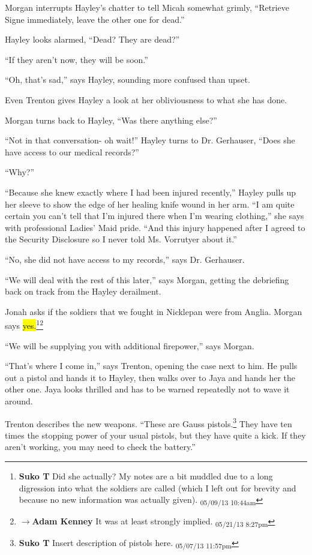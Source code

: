 Morgan interrupts Hayley's chatter to tell Micah somewhat grimly, ``Retrieve Signe immediately, leave the other one for dead.''

Hayley looks alarmed, ``Dead?  They are dead?''

``If they aren't now, they will be soon.''

``Oh, that's sad,'' says Hayley, sounding more confused than upset.

Even Trenton gives Hayley a look at her obliviousness to what she has done.

Morgan turns back to Hayley, ``Was there anything else?''

``Not in that conversation- oh wait!''  Hayley turns to Dr. Gerhauser, ``Does she have access to our medical records?''

``Why?''

``Because she knew exactly where I had been injured recently,'' Hayley pulls up her sleeve to show the edge of her healing knife wound in her arm. ``I am quite certain you can't tell that I'm injured there when I'm wearing clothing,'' she says with professional Ladies' Maid pride.  ``And this injury happened after I agreed to the Security Disclosure so I never told Ms. Vorrutyer about it.''

``No, she did not have access to my records,'' says Dr. Gerhauser.



``We will deal with the rest of this later,'' says Morgan, getting the debriefing back on track from the Hayley derailment.  

Jonah asks if the soldiers that we fought in Nicklepan were from Anglia.  Morgan says \hl{yes.}\footnote{\textbf{Suko T }Did she actually?  My notes are a bit muddled due to a long digression into what the soldiers are called (which I left out for brevity and because no new information was actually given). \textsubscript{05/09/13 10:44am}}\footnote{$\rightarrow$\textbf{Adam Kenney }It was at least strongly implied. \textsubscript{05/21/13 8:27pm}}

``We will be supplying you with additional firepower,'' says Morgan.

``That's where I come in,'' says Trenton, opening the case next to him.  He pulls out a pistol and hands it to Hayley, then walks over to Jaya and hands her the other one.  Jaya looks thrilled and has to be warned repeatedly not to wave it around. 

Trenton describes the new weapons.  ``These are Gauss pistols.\footnote{\textbf{Suko T }Insert description of pistols here. \textsubscript{05/07/13 11:57pm}}  They have ten times the stopping power of your usual pistols, but they have quite a kick.  If they aren't working, you may need to check the battery.''

